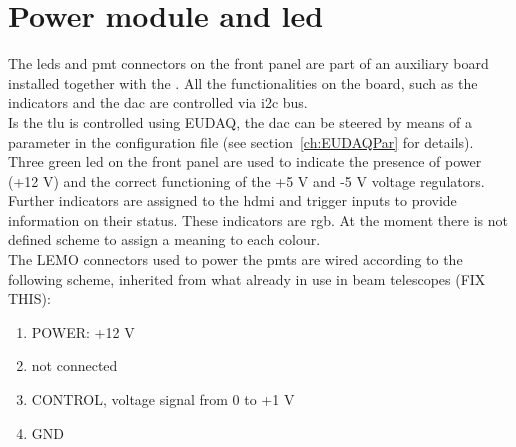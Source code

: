 \section{Power module and led}\label{ch:frontpanel}
The \gls{led}s and \gls{pmt} connectors on the front panel are part of an auxiliary board installed together with the \brd. All the functionalities on the board, such as the indicators and the \gls{dac} are controlled via \gls{i2c} bus.\\
Is the \gls{tlu} is controlled using EUDAQ, the \gls{dac} can be steered by means of a parameter in the configuration file (see section~\ref{ch:EUDAQPar} for details).\\
Three green \gls{led} on the front panel are used to indicate the presence of power (+12 V) and the correct functioning of the +5 V and -5 V voltage regulators. Further indicators are assigned to the \gls{hdmi} and trigger inputs to provide information on their status. These indicators are \gls{rgb}. At the moment there is not defined scheme to assign a meaning to each colour.\\
The LEMO connectors used to power the \gls{pmt}s are wired according to the following scheme, inherited from what already in use in beam telescopes (FIX THIS):
\begin{enumerate}
  \item POWER: +12 V
  \item not connected
  \item CONTROL, voltage signal from 0 to +1 V
  \item GND
\end{enumerate}
